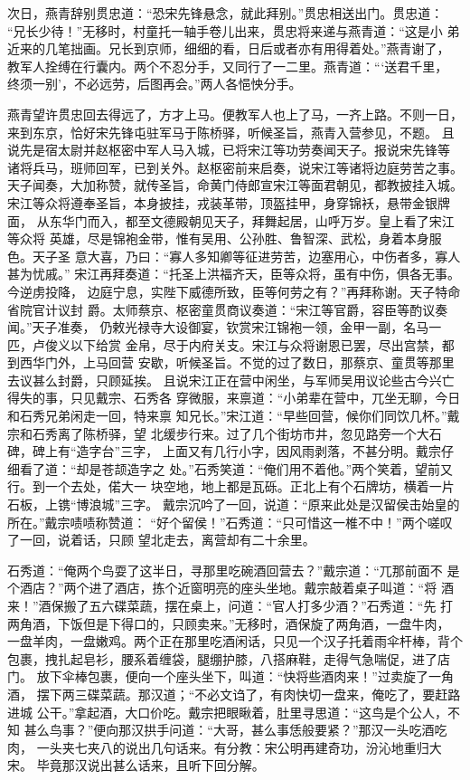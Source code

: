 次日，燕青辞别贯忠道：“恐宋先锋悬念，就此拜别。”贯忠相送出门。贯忠道：
“兄长少待！”无移时，村童托一轴手卷儿出来，贯忠将来递与燕青道：“这是小
弟近来的几笔拙画。兄长到京师，细细的看，日后或者亦有用得着处。”燕青谢了，
教军人拴缚在行囊内。两个不忍分手，又同行了一二里。燕青道：“‘送君千里，
终须一别’，不必远劳，后图再会。”两人各悒怏分手。

燕青望许贯忠回去得远了，方才上马。便教军人也上了马，一齐上路。不则一日，
来到东京，恰好宋先锋屯驻军马于陈桥驿，听候圣旨，燕青入营参见，不题。
且说先是宿太尉并赵枢密中军人马入城，已将宋江等功劳奏闻天子。报说宋先锋等
诸将兵马，班师回军，已到关外。赵枢密前来启奏，说宋江等诸将边庭劳苦之事。
天子闻奏，大加称赞，就传圣旨，命黄门侍郎宣宋江等面君朝见，都教披挂入城。
宋江等众将遵奉圣旨，本身披挂，戎装革带，顶盔挂甲，身穿锦袄，悬带金银牌面，
从东华门而入，都至文德殿朝见天子，拜舞起居，山呼万岁。皇上看了宋江等众将
英雄，尽是锦袍金带，惟有吴用、公孙胜、鲁智深、武松，身着本身服色。天子圣
意大喜，乃曰：“寡人多知卿等征进劳苦，边塞用心，中伤者多，寡人甚为忧戚。”
宋江再拜奏道：“托圣上洪福齐天，臣等众将，虽有中伤，俱各无事。今逆虏投降，
边庭宁息，实陛下威德所致，臣等何劳之有？”再拜称谢。天子特命省院官计议封
爵。太师蔡京、枢密童贯商议奏道：“宋江等官爵，容臣等酌议奏闻。”天子准奏，
仍敕光禄寺大设御宴，钦赏宋江锦袍一领，金甲一副，名马一匹，卢俊义以下给赏
金帛，尽于内府关支。宋江与众将谢恩已罢，尽出宫禁，都到西华门外，上马回营
安歇，听候圣旨。不觉的过了数日，那蔡京、童贯等那里去议甚么封爵，只顾延挨。
且说宋江正在营中闲坐，与军师吴用议论些古今兴亡得失的事，只见戴宗、石秀各
穿微服，来禀道：“小弟辈在营中，兀坐无聊，今日和石秀兄弟闲走一回，特来禀
知兄长。”宋江道：“早些回营，候你们同饮几杯。”戴宗和石秀离了陈桥驿，望
北缓步行来。过了几个街坊市井，忽见路旁一个大石碑，碑上有“造字台”三字，
上面又有几行小字，因风雨剥落，不甚分明。戴宗仔细看了道：“却是苍颉造字之
处。”石秀笑道：“俺们用不着他。”两个笑着，望前又行。到一个去处，偌大一
块空地，地上都是瓦砾。正北上有个石牌坊，横着一片石板，上镌“博浪城”三字。
戴宗沉吟了一回，说道：“原来此处是汉留侯击始皇的所在。”戴宗啧啧称赞道：
“好个留侯！”石秀道：“只可惜这一椎不中！”两个嗟叹了一回，说着话，只顾
望北走去，离营却有二十余里。

石秀道：“俺两个鸟耍了这半日，寻那里吃碗酒回营去？”戴宗道：“兀那前面不
是个酒店？”两个进了酒店，拣个近窗明亮的座头坐地。戴宗敲着桌子叫道：“将
酒来！”酒保搬了五六碟菜蔬，摆在桌上，问道：“官人打多少酒？”石秀道：“先
打两角酒，下饭但是下得口的，只顾卖来。”无移时，酒保旋了两角酒，一盘牛肉，
一盘羊肉，一盘嫩鸡。两个正在那里吃酒闲话，只见一个汉子托着雨伞杆棒，背个
包裹，拽扎起皂衫，腰系着缠袋，腿绷护膝，八搭麻鞋，走得气急喘促，进了店门。
放下伞棒包裹，便向一个座头坐下，叫道：“快将些酒肉来！”过卖旋了一角酒，
摆下两三碟菜蔬。那汉道；“不必文诌了，有肉快切一盘来，俺吃了，要赶路进城
公干。”拿起酒，大口价吃。戴宗把眼瞅着，肚里寻思道：“这鸟是个公人，不知
甚么鸟事？”便向那汉拱手问道：“大哥，甚么事恁般要紧？”那汉一头吃酒吃肉，
一头夹七夹八的说出几句话来。有分教：宋公明再建奇功，汾沁地重归大宋。
毕竟那汉说出甚么话来，且听下回分解。